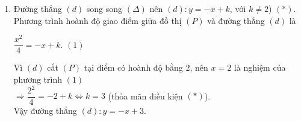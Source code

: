 \begin{ex}
{\begin{enumerate}
\begin{itemize}
{
				}
			\end{itemize}
			\item
			Đường thẳng $(d)$ song song $(\Delta)$ nên $(d):y=-x+k$, với $k\neq2$) $(*)$.\\
			Phương trình hoành độ giao điểm giữa đồ thị $(P)$ và đường thẳng $(d)$ là
			\begin{center}
				$\dfrac{x^2}{4}=-x+k$.      $(1)$
			\end{center}
			Vì $(d)$ cắt $(P)$ tại điểm có hoành độ bằng $2$, nên $x=2$ là nghiệm của phương trình $(1)$\\
			$\Rightarrow \dfrac{2^2}{4}=-2+k \Leftrightarrow k=3$ (thỏa mãn điều kiện $(*)$).\\
			Vậy đường thẳng $(d):y=-x+3$.
	\end{enumerate}}
\end{ex}

